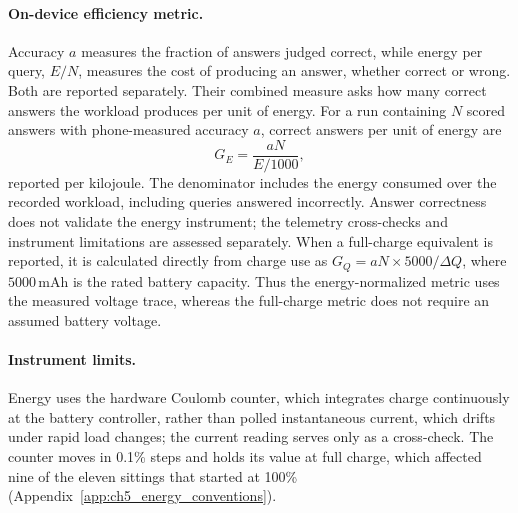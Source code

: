 \paragraph{On-device efficiency metric.} Accuracy $a$ measures the fraction of answers judged correct,
while energy per query, $E/N$, measures the cost of producing an answer, whether correct or wrong.
Both are reported separately. Their combined measure asks how many correct answers the workload
produces per unit of energy. For a run containing $N$ scored answers with phone-measured accuracy
$a$, correct answers per unit of energy are
\begin{equation}
  \label{eq:golden_metric}
  G_E = \frac{aN}{E/1000},
\end{equation}
reported per kilojoule. The denominator includes the energy consumed over the recorded workload,
including queries answered incorrectly. Answer correctness does not validate the energy instrument;
the telemetry cross-checks and instrument limitations are assessed separately.
When a full-charge equivalent is reported, it is calculated
directly from charge use as $G_Q = aN \times 5000 / \Delta Q$, where $5000\,\text{mAh}$ is the rated
battery capacity. Thus the energy-normalized metric uses the measured voltage trace, whereas the
full-charge metric does not require an assumed battery voltage.

\paragraph{Instrument limits.} Energy uses the hardware Coulomb counter, which integrates charge
continuously at the battery controller, rather than polled instantaneous current, which drifts under
rapid load changes; the current reading serves only as a cross-check. The counter moves in 0.1\% steps
and holds its value at full charge, which affected nine of the eleven sittings that started at 100\%
(Appendix~\ref{app:ch5_energy_conventions}).

